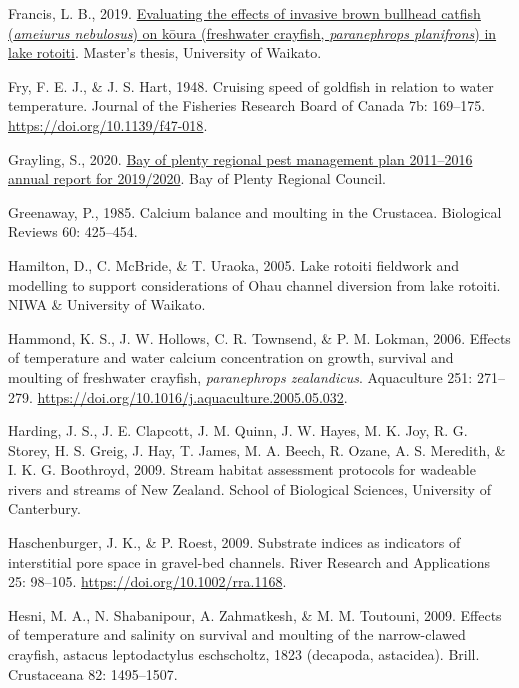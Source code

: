 \documentclass[
  letterpaper,
  DIV=11,
  numbers=noendperiod]{scrartcl}
\newlength{\cslhangindent}
\newenvironment{CSLReferences}[2] %
 {\begin{list}{}{%
  \setlength{\itemindent}{0pt}
  \setlength{\leftmargin}{0pt}
  \setlength{\parsep}{0pt}
  \ifodd #1
   \setlength{\leftmargin}{\cslhangindent}
   \setlength{\itemindent}{-1\cslhangindent}
  \fi
  \setlength{\itemsep}{#2\baselineskip}}}
 {\end{list}}
\begin{document}
\begin{CSLReferences}{0}{1}
Francis, L. B., 2019.
\href{https://researchcommons.waikato.ac.nz/handle/10289/12746}{Evaluating
the effects of invasive brown bullhead catfish (\emph{ameiurus
nebulosus}) on k{ō}ura (freshwater crayfish, \emph{paranephrops
planifrons}) in lake rotoiti}. Master's thesis, University of Waikato.

Fry, F. E. J., \& J. S. Hart, 1948. Cruising speed of goldfish in
relation to water temperature. Journal of the Fisheries Research Board
of Canada 7b: 169--175. \url{https://doi.org/10.1139/f47-018}.

Grayling, S., 2020.
\href{https://atlas.boprc.govt.nz/api/v1/edms/document/A3651696/content}{Bay
of plenty regional pest management plan 2011--2016 annual report for
2019/2020}. Bay of Plenty Regional Council.

Greenaway, P., 1985. Calcium balance and moulting in the {Crustacea}.
Biological Reviews 60: 425--454.

Hamilton, D., C. McBride, \& T. Uraoka, 2005. Lake rotoiti fieldwork and
modelling to support considerations of {Ohau} channel diversion from
lake rotoiti. NIWA \& University of Waikato.

Hammond, K. S., J. W. Hollows, C. R. Townsend, \& P. M. Lokman, 2006.
Effects of temperature and water calcium concentration on growth,
survival and moulting of freshwater crayfish, \emph{paranephrops
zealandicus}. Aquaculture 251: 271--279.
\url{https://doi.org/10.1016/j.aquaculture.2005.05.032}.

Harding, J. S., J. E. Clapcott, J. M. Quinn, J. W. Hayes, M. K. Joy, R.
G. Storey, H. S. Greig, J. Hay, T. James, M. A. Beech, R. Ozane, A. S.
Meredith, \& I. K. G. Boothroyd, 2009. Stream habitat assessment
protocols for wadeable rivers and streams of {New Zealand}. School of
Biological Sciences, University of Canterbury.

Haschenburger, J. K., \& P. Roest, 2009. Substrate indices as indicators
of interstitial pore space in gravel-bed channels. River Research and
Applications 25: 98--105. \url{https://doi.org/10.1002/rra.1168}.

Hesni, M. A., N. Shabanipour, A. Zahmatkesh, \& M. M. Toutouni, 2009.
Effects of temperature and salinity on survival and moulting of the
narrow-clawed crayfish, astacus leptodactylus eschscholtz, 1823
(decapoda, astacidea). Brill. Crustaceana 82: 1495--1507.


\end{CSLReferences}
\end{document}
